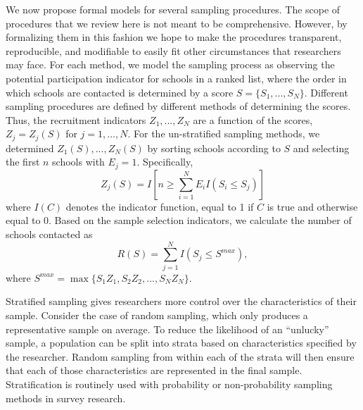 \documentclass[
  english,
  man,floatsintext]{apa6}
\begin{document}
We now propose formal models for several sampling procedures. The scope of procedures that we review here is not meant to be comprehensive. However, by formalizing them in this fashion we hope to make the procedures transparent, reproducible, and modifiable to easily fit other circumstances that researchers may face.
For each method, we model the sampling process as observing the potential participation indicator for schools in a ranked list, where the order in which schools are contacted is determined by a score \(S = \{S_1,...,S_N\}\). Different sampling procedures are defined by different methods of determining the scores. Thus, the recruitment indicators \(Z_1,...,Z_N\) are a function of the scores, \(Z_j = Z_j(S)\) for \(j = 1,...,N\).
For the un-stratified sampling methods, we determined \(Z_1(S),...,Z_N(S)\) by sorting schools according to \(S\) and selecting the first \(n\) schools with \(E_j = 1\).
Specifically,
\begin{equation}
\label{eq:Zj}
Z_j(S) = I\left[n \geq \sum_{i=1}^N E_i I\left(S_i \leq S_j\right)\right]
\end{equation}
where \(I(C)\) denotes the indicator function, equal to 1 if \(C\) is true and otherwise equal to 0. Based on the sample selection indicators, we calculate the number of schools contacted as
\begin{equation}
\label{eq:R}
R(S) = \sum_{j=1}^N I\left(S_j \leq S^{max}\right),
\end{equation}
where \(S^{max} = \max \{S_1 Z_1, S_2 Z_2, ..., S_N Z_N\}\).

Stratified sampling gives researchers more control over the characteristics of their sample. Consider the case of random sampling, which only produces a representative sample on average. To reduce the likelihood of an ``unlucky'' sample, a population can be split into strata based on characteristics specified by the researcher. Random sampling from within each of the strata will then ensure that each of those characteristics are represented in the final sample. Stratification is routinely used with probability or non-probability sampling methods in survey research.
\end{document}
